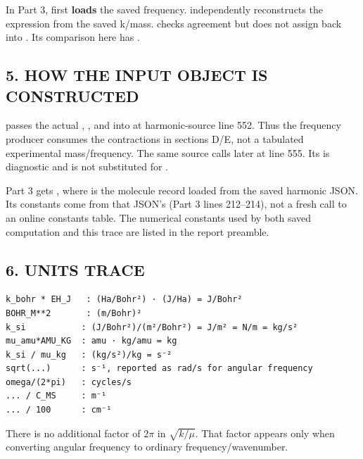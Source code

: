 \documentclass[10pt,a4paper]{article}
\begin{document}
In Part 3,  first \textbf{loads} the saved frequency.  independently reconstructs the expression from the saved k/mass.  checks agreement but does not assign  back into . Its comparison here has .

\subsection{5. HOW THE INPUT OBJECT IS CONSTRUCTED}
 passes the actual , , and  into  at harmonic-source line 552. Thus the frequency producer consumes the contractions in sections D/E, not a tabulated experimental mass/frequency. The same source calls  later at line 555. Its  is diagnostic and is not substituted for .

Part 3 gets , where  is the molecule record loaded from the saved harmonic JSON. Its constants come from that JSON's  (Part 3 lines 212–214), not a fresh call to an online constants table. The numerical constants used by both saved computation and this trace are listed in the report preamble.

\subsection{6. UNITS TRACE}
\begin{Verbatim}
k_bohr * EH_J   : (Ha/Bohr²) · (J/Ha) = J/Bohr²
BOHR_M**2       : (m/Bohr)²
k_si           : (J/Bohr²)/(m²/Bohr²) = J/m² = N/m = kg/s²
mu_amu*AMU_KG  : amu · kg/amu = kg
k_si / mu_kg   : (kg/s²)/kg = s⁻²
sqrt(...)      : s⁻¹, reported as rad/s for angular frequency
omega/(2*pi)   : cycles/s
... / C_MS     : m⁻¹
... / 100      : cm⁻¹
\end{Verbatim}
There is no additional factor of \(2\pi\) in \(\sqrt{k/\mu}\). That factor appears only when converting angular frequency to ordinary frequency/wavenumber.
\end{document}
